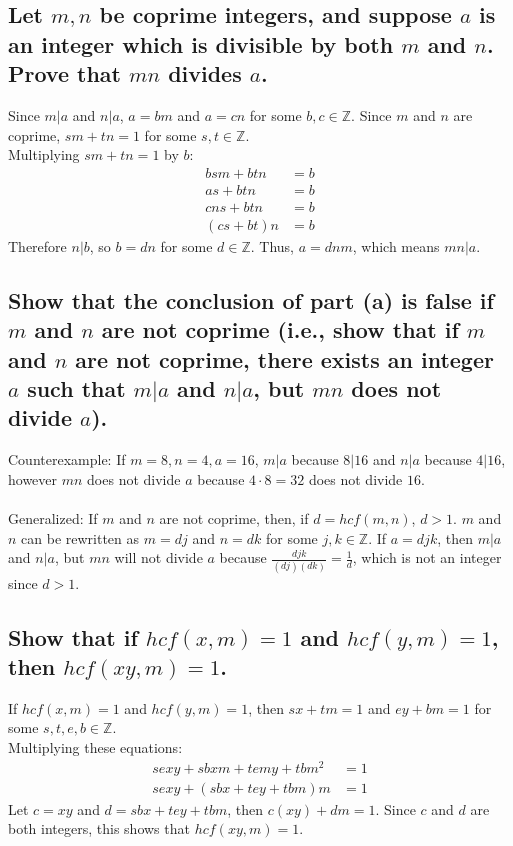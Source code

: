 \documentclass[12pt]{article}
\begin{document}
\subsection{Let $m,n$ be coprime integers, and suppose $a$ is an integer which is divisible by both $m$ and $n$. Prove that $mn$ divides $a$.}
Since $m|a$ and $n|a$, $a = bm$ and $a=cn$ for some $b,c \in \mathds{Z}$.
Since $m$ and $n$ are coprime, $sm+tn=1$ for some $s,t \in \mathds{Z}$.\\
Multiplying $sm+tn=1$ by $b$:
\begin{align*}
    bsm+btn&=b\\
    as+btn&=b\\
    cns+btn&=b\\
    (cs+bt)n&=b
\end{align*}
Therefore $n|b$, so $b=dn$ for some $d \in \mathds{Z}$. Thus, $a=dnm$, which means $mn|a$.

\subsection{
    Show that the conclusion of part (a) is false if $m$ and $n$ are not coprime
    (i.e., show that if $m$ and $n$ are not coprime, there exists an integer $a$ such that
    $m|a$ and $n|a$, but $mn$ does not divide $a$).
}
Counterexample: If $m=8,n=4,a=16$, $m|a$ because $8|16$ and $n|a$ because $4|16$,
however $mn$ does not divide $a$ because $4\cdotp 8=32$ does not divide $16$.\\\\
Generalized: If $m$ and $n$ are not coprime, then, if $d=hcf(m,n)$, $d>1$.
$m$ and $n$ can be rewritten as $m=dj$ and $n=dk$ for some $j,k \in \mathds{Z}$.
If $a = djk$, then $m|a$ and $n|a$, but $mn$ will not divide $a$ 
because $\frac{djk}{(dj)(dk)} = \frac{1}{d}$, which is not an integer since $d>1$.

\subsection{Show that if $hcf(x,m)=1$ and $hcf(y,m)=1$, then $hcf(xy,m)=1$.}
If $hcf(x,m)=1$ and $hcf(y,m)=1$, then $sx+tm=1$ and $ey+bm=1$ for some $s,t,e,b \in \mathds{Z}$.\\
Multiplying these equations:
\begin{align*}
    sexy+sbxm+temy+tbm^2&=1\\
    sexy+(sbx+tey+tbm)m&=1
\end{align*}
Let $c=xy$ and $d=sbx+tey+tbm$, then $c(xy) + dm = 1$. 
Since $c$ and $d$ are both integers, this shows that $hcf(xy,m)=1$.
\end{document}
